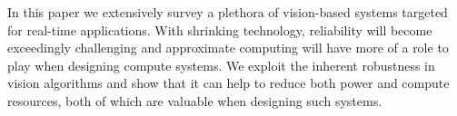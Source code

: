 In this paper we extensively survey a plethora of vision-based systems 
targeted for real-time applications. 
With shrinking technology, reliability will 
become exceedingly challenging and approximate computing will have more of a role to play when 
designing compute systems. We exploit the inherent robustness 
in vision algorithms and show that it can help to reduce both 
power and compute resources, both of which are valuable when designing such systems. 
